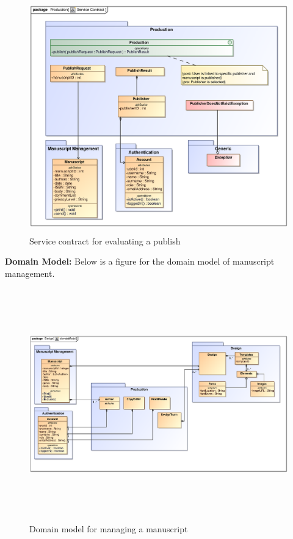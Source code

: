 \begin{enumerate}
\begin{figure}[h]
\includegraphics[height=380px, width=500px]{epsImages/Production/Publish.eps}
\caption{Service contract for evaluating a publish}
\end{figure}

 \newpage
\textbf{Domain Model:} Below is a figure for the domain model of manuscript management. 

\begin{figure}[h]
\includegraphics[height=380px, width=500px]{epsImages/DomainModels/ProductionDomainModel.eps}
\caption{Domain model for managing a manuscript}
\end{figure}


\end{enumerate}
